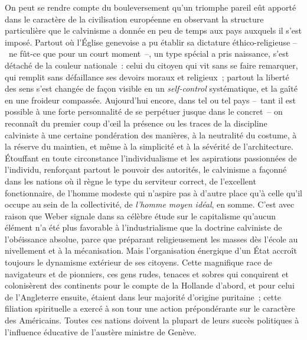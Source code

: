 \documentclass[french,twoside]{book} %
\begin{document}
On peut se rendre compte du bouleversement qu’un triomphe pareil eût apporté dans le caractère de la civilisation européenne en observant la structure particulière que le calvinisme a donnée en peu de temps aux pays auxquels il s’est imposé. Partout où l’Église genevoise a pu établir sa dictature éthico-religieuse – ne fût-ce que pour un court moment –, un type spécial a pris naissance, s’est détaché de la couleur nationale : celui du citoyen qui vit sans se faire remarquer, qui remplit sans défaillance ses devoirs moraux et religieux ; partout la liberté des sens s’est changée de façon visible en un \emph{self-control} systématique, et la gaîté en une froideur compassée. Aujourd’hui encore, dans tel ou tel pays – tant il est possible à une forte personnalité de se perpétuer jusque dans le concret – on reconnaît du premier coup d’œil la présence ou les traces de la discipline calviniste à une certaine pondération des manières, à la neutralité du costume, à la réserve du maintien, et même à la simplicité et à la sévérité de l’architecture. Étouffant en toute circonstance l’individualisme et les aspirations passionnées de l’individu, renforçant partout le pouvoir des autorités, le calvinisme a façonné dans les nations où il règne le type du serviteur correct, de l’excellent fonctionnaire, de l’homme modeste qui n’aspire pas à d’autre place qu’à celle qu’il occupe au sein de la collectivité, de \emph{l’homme moyen idéal}, en somme. C’est avec raison que Weber signale dans sa célèbre étude sur le capitalisme qu’aucun élément n’a été plus favorable à l’industrialisme que la doctrine calviniste de l’obéissance absolue, parce que préparant religieusement les masses dès l’école au nivellement et à la mécanisation. Mais l’organisation énergique d’un État accroît toujours le dynamisme extérieur de ses citoyens. Cette magnifique race de navigateurs et de pionniers, ces gens rudes, tenaces et sobres qui conquirent et colonisèrent des continents pour le compte de la Hollande d’abord, et pour celui de l’Angleterre ensuite, étaient dans leur majorité d’origine puritaine ; cette filiation spirituelle a exercé à son tour une action prépondérante sur le caractère des Américains. Toutes ces nations doivent la plupart de leurs succès politiques à l’influence éducative de l’austère ministre de Genève.\par
\end{document}
